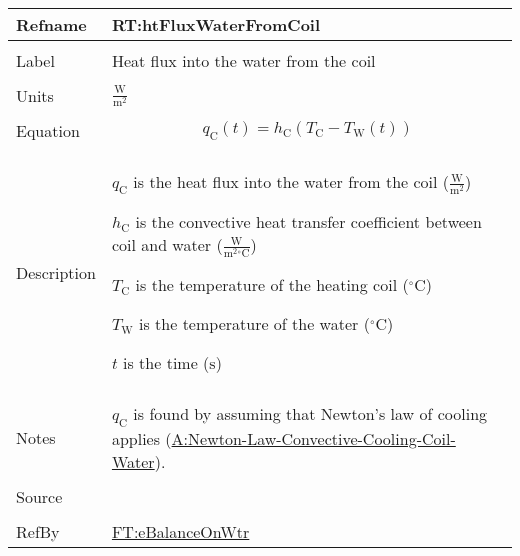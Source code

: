 \documentclass[12pt]{article}
\begin{document}
\vspace{\baselineskip}
\noindent
\begin{minipage}{\textwidth}
\begin{tabular}{>{\raggedright}p{}>{\raggedright\arraybackslash}p{}}
\toprule \textbf{Refname} & \textbf{RT:htFluxWaterFromCoil}
\label{RT:htFluxWaterFromCoil}
\\ \midrule \\
Label & Heat flux into the water from the coil
        
\\ \midrule \\
Units & $\frac{\text{W}}{\text{m}^{2}}$
        
\\ \midrule \\
Equation & \begin{displaymath}
           {q_{\text{C}}(t)}={h_{\text{C}}} \left({T_{\text{C}}}-{T_{\text{W}}}\left(t\right)\right)
           \end{displaymath}
\\ \midrule \\
Description & \begin{symbDescription}
              \item{${q_{\text{C}}}$ is the heat flux into the water from the coil ($\frac{\text{W}}{\text{m}^{2}}$)}
              \item{${h_{\text{C}}}$ is the convective heat transfer coefficient between coil and water ($\frac{\text{W}}{\text{m}^{2}{}^{\circ}\text{C}}$)}
              \item{${T_{\text{C}}}$ is the temperature of the heating coil (${{}^{\circ}\text{C}}$)}
              \item{${T_{\text{W}}}$ is the temperature of the water (${{}^{\circ}\text{C}}$)}
              \item{$t$ is the time (${\text{s}}$)}
              \end{symbDescription}
\\ \midrule \\
Notes & ${q_{\text{C}}}$ is found by assuming that Newton's law of cooling
applies (\hyperref[assumpLCCCW]{A:Newton-Law-Convective-Cooling-Coil-Water}).
        
\\ \midrule \\
Source & \cite{koothoor2013}
                  
\\ \midrule \\
RefBy & \hyperref[FT:eBalanceOnWtr]{FT:eBalanceOnWtr}
        
\\ \bottomrule
\end{tabular}
\end{minipage}
\end{document}
